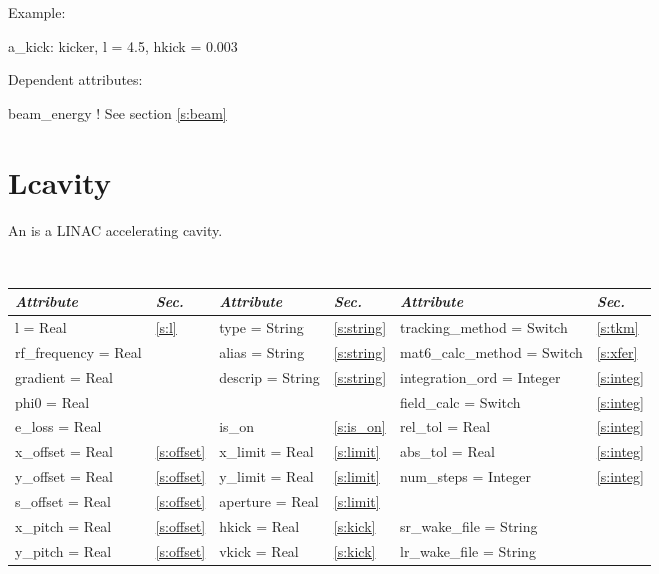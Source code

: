 \vskip0.05in \noindent
Example:
\begin{example}
  a_kick: kicker, l = 4.5, hkick = 0.003
\end{example}

\vskip0.05in \noindent
Dependent attributes:
\begin{example}
  beam\_energy  ! See section \ref{s:beam}
\end{example}

\section{Lcavity}
\label{s:lcav}

An  is a LINAC accelerating cavity.

\toffset
\begin{center}
\tt
\begin{tabular}{|l|l||l|l||l|l|} \hline
  {\sl Attribute} & {\sl Sec.}  & {\sl Attribute} & {\sl Sec.} & {\sl Attribute} & {\sl Sec.} \\ \hline
  l        = Real       & \ref{s:l}      & type = String      & \ref{s:string} & tracking\_method = Switch   & \ref{s:tkm}   \\ \hline
  rf\_frequency = Real  &                & alias = String     & \ref{s:string} & mat6\_calc\_method = Switch & \ref{s:xfer}  \\ \hline
  gradient      = Real  &                & descrip = String   & \ref{s:string} & integration\_ord = Integer  & \ref{s:integ} \\ \hline
  phi0          = Real  &                &                    &                & field\_calc = Switch        & \ref{s:integ} \\ \hline
  e\_loss       = Real  &                & is\_on             & \ref{s:is_on}  & rel\_tol = Real             & \ref{s:integ} \\ \hline
  x\_offset  = Real     & \ref{s:offset} & x\_limit = Real    & \ref{s:limit}  & abs\_tol = Real             & \ref{s:integ} \\ \hline
  y\_offset  = Real     & \ref{s:offset} & y\_limit = Real    & \ref{s:limit}  & num\_steps = Integer        & \ref{s:integ} \\ \hline
  s\_offset  = Real     & \ref{s:offset} & aperture = Real    & \ref{s:limit}  &                             &               \\ \hline
  x\_pitch = Real       & \ref{s:offset} & hkick    = Real    & \ref{s:kick}   & sr\_wake\_file = String     &               \\ \hline
  y\_pitch = Real       & \ref{s:offset} & vkick    = Real    & \ref{s:kick}   & lr\_wake\_file = String     &               \\ \hline
\end{tabular}
\end{center}
\toffset

